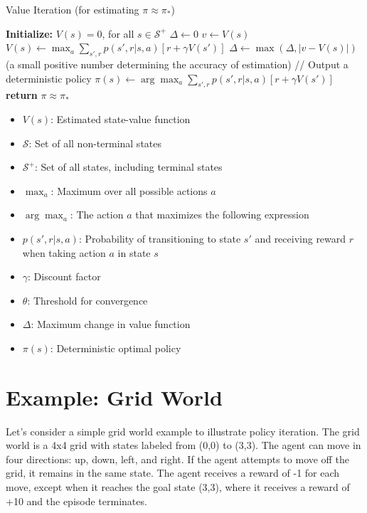 \documentclass{article}
\begin{document}
\begin{algorithm}
\caption{Value Iteration (for estimating $\pi \approx \pi_*$)}
\begin{algorithmic}[1]
\State \textbf{Initialize:} $V(s) = 0$, for all $s \in \mathcal{S}^+$
\Repeat
\State $\Delta \gets 0$
\State $v \gets V(s)$
\State $V(s) \gets \max_a \sum_{s',r} p(s',r|s,a)[r + \gamma V(s')]$
\State $\Delta \gets \max(\Delta, |v - V(s)|)$
\EndFor
\Until{$\Delta < \theta$} (a small positive number determining the accuracy of estimation)
\State // Output a deterministic policy
\State $\pi(s) \gets \arg\max_a \sum_{s',r} p(s',r|s,a)[r + \gamma V(s')]$
\EndFor
\State \textbf{return} $\pi \approx \pi_*$
\end{algorithmic}
\end{algorithm}

\begin{tcolorbox}[colframe=blue!50!black, colback=blue!10, title=Notation Overview]
\begin{itemize}
    \item $V(s)$: Estimated state-value function
    \item $\mathcal{S}$: Set of all non-terminal states
    \item $\mathcal{S}^+$: Set of all states, including terminal states
    \item $\max_a$: Maximum over all possible actions $a$
    \item $\arg\max_a$: The action $a$ that maximizes the following expression
    \item $p(s',r|s,a)$: Probability of transitioning to state $s'$ and receiving reward $r$ when taking action $a$ in state $s$
    \item $\gamma$: Discount factor
    \item $\theta$: Threshold for convergence
    \item $\Delta$: Maximum change in value function
    \item $\pi(s)$: Deterministic optimal policy
\end{itemize}
\end{tcolorbox}

\section{Example: Grid World}

Let's consider a simple grid world example to illustrate policy iteration. The grid world is a 4x4 grid with states labeled from (0,0) to (3,3). The agent can move in four directions: up, down, left, and right. If the agent attempts to move off the grid, it remains in the same state. The agent receives a reward of -1 for each move, except when it reaches the goal state (3,3), where it receives a reward of +10 and the episode terminates.
\end{document}
